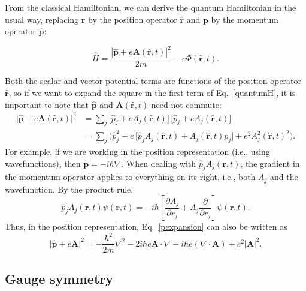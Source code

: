 \documentclass[prx,12pt]{revtex4-2}
\begin{document}
From the classical Hamiltonian, we can derive the quantum Hamiltonian
in the usual way, replacing $\mathbf{r}$ by the position operator
$\hat{\mathbf{r}}$ and $\mathbf{p}$ by the momentum operator
$\hat{\mathbf{p}}$:
\begin{framed}
  \begin{equation}
    \hat{H} = \frac{|\hat{\mathbf{p}}+e\mathbf{A}(\hat{\mathbf{r}},t)|^2}{2m}
    - e\Phi(\hat{\mathbf{r}},t).
    \label{quantumH}
  \end{equation}
\end{framed}
\noindent
Both the scalar and vector potential terms are functions of the
position operator $\hat{\mathbf{r}}$, so if we want to expand the
square in the first term of Eq.~\eqref{quantumH}, it is important to
note that $\hat{\mathbf{p}}$ and $\mathbf{A}(\hat{\mathbf{r}},t)$ need
not commute:
\begin{align}
  \big|\hat{\mathbf{p}}+e\mathbf{A}(\hat{\mathbf{r}},t)\big|^2
  &= \sum_j \Big[\hat{p}_j + e A_j(\hat{\mathbf{r}},t)\Big] \,
  \Big[\hat{p}_j + e A_j(\hat{\mathbf{r}},t)\Big]\\
  &= \sum_j \Big( \hat{p}_j^2
  + e\, \big[\hat{p}_j A_j(\hat{\mathbf{r}},t) + A_j(\hat{\mathbf{r}},t) p_j\big]
  + e^2A_j^2(\hat{\mathbf{r}},t)^2 \Big).
  \label{pexpansion}
\end{align}
For example, if we are working in the position representation (i.e.,
using wavefunctions), then $\hat{\mathbf{p}} = -i\hbar\nabla$.  When
dealing with $\hat{p}_j A_j(\mathbf{r},t)$, the gradient in the
momentum operator applies to everything on its right, i.e., both $A_j$
and the wavefunction.  By the product rule,
\begin{equation}
  \hat{p}_j A_j(\mathbf{r},t) \psi(\mathbf{r},t)
  = -i\hbar \left[\frac{\partial A_j}{\partial r_j} + A_j \frac{\partial}{\partial r_j}\right] \psi(\mathbf{r},t).
\end{equation}
Thus, in the position representation, Eq.~\eqref{pexpansion} can also
be written as
\begin{equation}
  \big|\hat{\mathbf{p}}+e\mathbf{A}\big|^2
  = - \frac{\hbar^2}{2m} \nabla^2
  - 2 i \hbar e \mathbf{A} \cdot \nabla
  - i \hbar e \left(\nabla\cdot \mathbf{A}\right)
  + e^2|\mathbf{A}|^2.
\end{equation}

\subsection{Gauge symmetry}
\label{sec:gauge}
\end{document}
